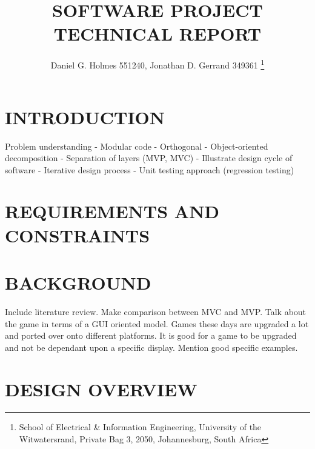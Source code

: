 \documentclass[10pt,twocolumn]{witseiepaper}
\begin{document}
\title{SOFTWARE PROJECT TECHNICAL REPORT}

\author{Daniel G. Holmes 551240, Jonathan D. Gerrand 349361
\thanks{School of Electrical \& Information Engineering, University of the
Witwatersrand, Private Bag 3, 2050, Johannesburg, South Africa}
}

%



\maketitle
\thispagestyle{empty}\pagestyle{empty}


%
\section{INTRODUCTION}
Problem understanding
- Modular code
- Orthogonal
- Object-oriented decomposition
- Separation of layers (MVP, MVC)
- Illustrate design cycle of software
- Iterative design process
- Unit testing approach (regression testing)


%
\section{REQUIREMENTS AND CONSTRAINTS}



%
\section{BACKGROUND}
Include literature review. Make comparison between MVC and MVP. Talk about the game in terms of a GUI oriented model. Games these days are upgraded a lot and ported over onto different platforms. It is good for a game to be upgraded and not be dependant upon a specific display. Mention good specific examples. 

%
\section{DESIGN OVERVIEW}
\end{document}
